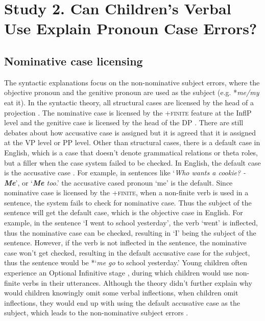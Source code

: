 \section{Study 2. Can Children's Verbal Use Explain Pronoun Case Errors? }
\subsection{Nominative case licensing}
The syntactic explanations focus on the non-nominative subject errors, where the objective pronoun and the genitive pronoun are used as the subject (e.g. *\textit{me/my} eat it). In the syntactic theory, all structural cases are licensed by the head of a projection \citep[see][]{chomsky2000minimalist}. The nominative case is licensed by the \textsc{+finite} feature at the InflP level \citep[e.g.][]{haider1985unified, alec1991case} and the genitive case is licensed by the head of the DP \citep[e.g.][]{ritter1991two}. There are still debates about how accusative case is assigned but it is agreed that it is assigned at the VP level or PP level. Other than structural cases, there is a default case in English, which is a case that doesn't denote grammatical relations or theta roles, but a filler when the case system failed to be checked. In English, the default case is the accusative case \citep{schutze1997, schutze2001}. For example, in sentences like `\textit{Who wants a cookie? - \textbf{Me}}', or `\textit{\textbf{Me} too}.' the accusative cased pronoun `me' is the default. Since nominative case is licensed by the \textsc{+finite}, when a non-finite verb is used in a sentence, the system fails to check for nominative case. Thus the subject of the sentence will get the default case, which is the objective case in English. For example, in the sentence `I went to school yesterday', the verb `went' is inflected, thus the nominative case can be checked, resulting in `I' being the subject of the sentence. However, if the verb is not inflected in the sentence, the nominative case won't get checked, resulting in the default accusative case for the subject, thus the sentence would be *`\textit{me} \textit{go} to school yesterday.' Young children often experience an Optional Infinitive stage \citep{wexler1994, wexler1998, wexler2000}, during which children would use non-finite verbs in their utterances. Although the theory didn't further explain why would children knowingly omit some verbal inflections, when children omit inflections, they would end up with using the default accusative case as the subject, which leads to the non-nominative subject errors \citep{schutze1996subject}.  

